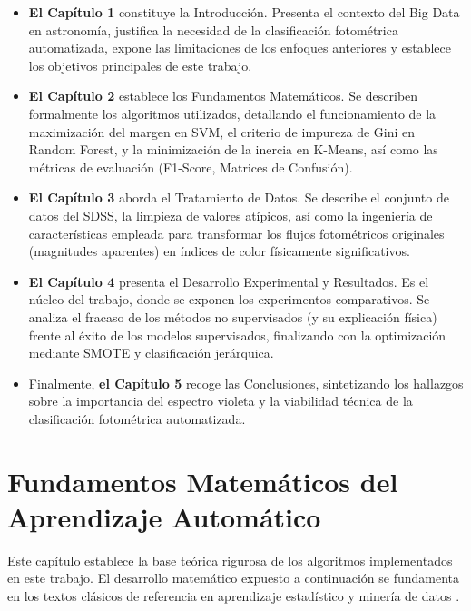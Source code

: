 \documentclass[12pt, a4paper]{report}
\begin{document}
\begin{itemize}
    \item \textbf{El Capítulo 1} constituye la Introducción. Presenta el contexto del Big Data en astronomía, justifica la necesidad de la clasificación fotométrica automatizada, expone las limitaciones de los enfoques anteriores y establece los objetivos principales de este trabajo.
    
    \item \textbf{El Capítulo 2} establece los Fundamentos Matemáticos. Se describen formalmente los algoritmos utilizados, detallando el funcionamiento de la maximización del margen en SVM, el criterio de impureza de Gini en Random Forest, y la minimización de la inercia en K-Means, así como las métricas de evaluación (F1-Score, Matrices de Confusión).
    
    \item \textbf{El Capítulo 3} aborda el Tratamiento de Datos. Se describe el conjunto de datos del SDSS, la limpieza de valores atípicos, así como la ingeniería de características empleada para transformar los flujos fotométricos originales (magnitudes aparentes) en índices de color físicamente significativos.
    
    \item \textbf{El Capítulo 4} presenta el Desarrollo Experimental y Resultados. Es el núcleo del trabajo, donde se exponen los experimentos comparativos. Se analiza el fracaso de los métodos no supervisados (y su explicación física) frente al éxito de los modelos supervisados, finalizando con la optimización mediante SMOTE y clasificación jerárquica.
    
    \item Finalmente, \textbf{el Capítulo 5} recoge las Conclusiones, sintetizando los hallazgos sobre la importancia del espectro violeta y la viabilidad técnica de la clasificación fotométrica automatizada.
\end{itemize}

\chapter{Fundamentos Matemáticos del Aprendizaje Automático}
\label{chap:fundamentos}

Este capítulo establece la base teórica rigurosa de los algoritmos implementados en este trabajo. El desarrollo matemático expuesto a continuación se fundamenta en los textos clásicos de referencia en aprendizaje estadístico y minería de datos \citep{orallo2004, hastie2009, maimon2010, james2013}.
\end{document}

